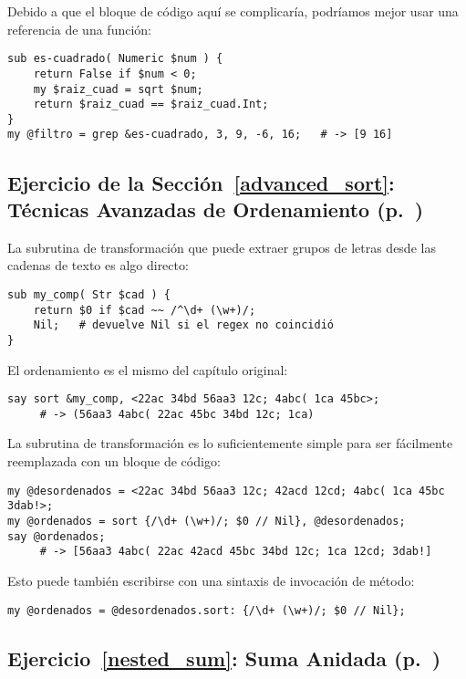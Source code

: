 Debido a que el bloque de código aquí se complicaría, podríamos
mejor usar una referencia de una función:

\begin{verbatim}
sub es-cuadrado( Numeric $num ) { 
    return False if $num < 0;
    my $raiz_cuad = sqrt $num;
    return $raiz_cuad == $raiz_cuad.Int;
} 
my @filtro = grep &es-cuadrado, 3, 9, -6, 16;   # -> [9 16]
\end{verbatim}
%
\subsection{Ejercicio de la Sección~\ref{advanced_sort}: Técnicas Avanzadas de Ordenamiento (p.~\pageref{sort_exercise})}
\label{sol_sort_exercise}

La subrutina de transformación que puede extraer grupos de
letras desde las cadenas de texto es algo directo:

\begin{verbatim}
sub my_comp( Str $cad ) {
    return $0 if $cad ~~ /^\d+ (\w+)/; 
    Nil;   # devuelve Nil si el regex no coincidió
}
\end{verbatim}
%
El ordenamiento es el mismo del capítulo original:
\begin{verbatim}
say sort &my_comp, <22ac 34bd 56aa3 12c; 4abc( 1ca 45bc>;
     # -> (56aa3 4abc( 22ac 45bc 34bd 12c; 1ca)
\end{verbatim}

La subrutina de transformación es lo suficientemente simple
para ser fácilmente reemplazada con un bloque de código:

\begin{verbatim}
my @desordenados = <22ac 34bd 56aa3 12c; 42acd 12cd; 4abc( 1ca 45bc 3dab!>;
my @ordenados = sort {/\d+ (\w+)/; $0 // Nil}, @desordenados;
say @ordenados; 
     # -> [56aa3 4abc( 22ac 42acd 45bc 34bd 12c; 1ca 12cd; 3dab!]
\end{verbatim}
%
Esto puede también escribirse con una sintaxis de 
invocación de método:
\begin{verbatim}
my @ordenados = @desordenados.sort: {/\d+ (\w+)/; $0 // Nil};
\end{verbatim}
%

\subsection{Ejercicio~\ref{nested_sum}: Suma Anidada (p.~\pageref{nested_sum})}
\label{sol_nested_sum}

